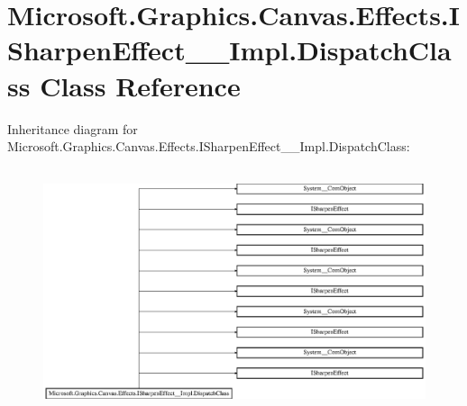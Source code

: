 \hypertarget{class_microsoft_1_1_graphics_1_1_canvas_1_1_effects_1_1_i_sharpen_effect_____impl_1_1_dispatch_class}{}\section{Microsoft.\+Graphics.\+Canvas.\+Effects.\+I\+Sharpen\+Effect\+\_\+\+\_\+\+Impl.\+Dispatch\+Class Class Reference}
\label{class_microsoft_1_1_graphics_1_1_canvas_1_1_effects_1_1_i_sharpen_effect_____impl_1_1_dispatch_class}
Inheritance diagram for Microsoft.\+Graphics.\+Canvas.\+Effects.\+I\+Sharpen\+Effect\+\_\+\+\_\+\+Impl.\+Dispatch\+Class\+:\begin{figure}[H]
\begin{center}
\leavevmode
\includegraphics[height=7.230048cm]{class_microsoft_1_1_graphics_1_1_canvas_1_1_effects_1_1_i_sharpen_effect_____impl_1_1_dispatch_class}
\end{center}
\end{figure}
